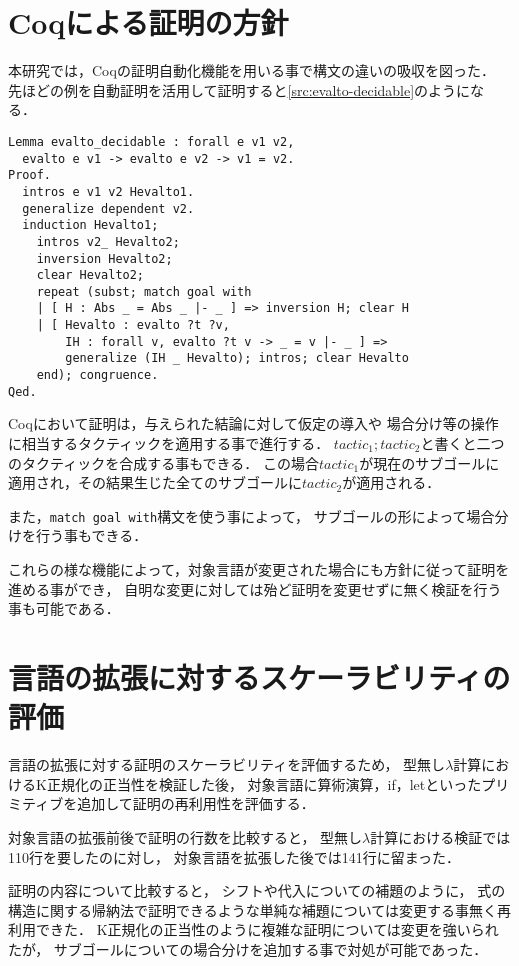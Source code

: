 \documentclass{sumiilab-paper}
\begin{document}
\section{Coqによる証明の方針}
本研究では，Coqの証明自動化機能を用いる事で構文の違いの吸収を図った．
先ほどの例を自動証明を活用して証明すると\lstlistingname\ref{src:evalto-decidable}のようになる．
\begin{lstlisting}[caption=自動証明の活用例,label=src:evalto-decidable]
Lemma evalto_decidable : forall e v1 v2,
  evalto e v1 -> evalto e v2 -> v1 = v2.
Proof.
  intros e v1 v2 Hevalto1.
  generalize dependent v2.
  induction Hevalto1;
    intros v2_ Hevalto2;
    inversion Hevalto2;
    clear Hevalto2;
    repeat (subst; match goal with
    | [ H : Abs _ = Abs _ |- _ ] => inversion H; clear H
    | [ Hevalto : evalto ?t ?v,
        IH : forall v, evalto ?t v -> _ = v |- _ ] =>
        generalize (IH _ Hevalto); intros; clear Hevalto
    end); congruence.
Qed.
\end{lstlisting}

Coqにおいて証明は，与えられた結論に対して仮定の導入や
場合分け等の操作に相当するタクティックを適用する事で進行する．\cite{09thecoq}
$\mathit{tactic}_1;\mathit{tactic}_2$と書くと二つのタクティックを合成する事もできる．
この場合$\mathit{tactic}_1$が現在のサブゴールに適用され，その結果生じた全てのサブゴールに$\mathit{tactic}_2$が適用される．

また，\lstinline|match goal with|構文を使う事によって，
サブゴールの形によって場合分けを行う事もできる．

これらの様な機能によって，対象言語が変更された場合にも方針に従って証明を進める事ができ，
自明な変更に対しては殆ど証明を変更せずに無く検証を行う事も可能である．

\section{言語の拡張に対するスケーラビリティの評価}
言語の拡張に対する証明のスケーラビリティを評価するため，
型無し$\lambda$計算におけるK正規化の正当性を検証した後，
対象言語に算術演算，if，letといったプリミティブを追加して証明の再利用性を評価する．

対象言語の拡張前後で証明の行数を比較すると，
型無し$\lambda$計算における検証では110行を要したのに対し，
対象言語を拡張した後では141行に留まった．

証明の内容について比較すると，
シフトや代入についての補題のように，
式の構造に関する帰納法で証明できるような単純な補題については変更する事無く再利用できた．
K正規化の正当性のように複雑な証明については変更を強いられたが，
サブゴールについての場合分けを追加する事で対処が可能であった．
\end{document}
